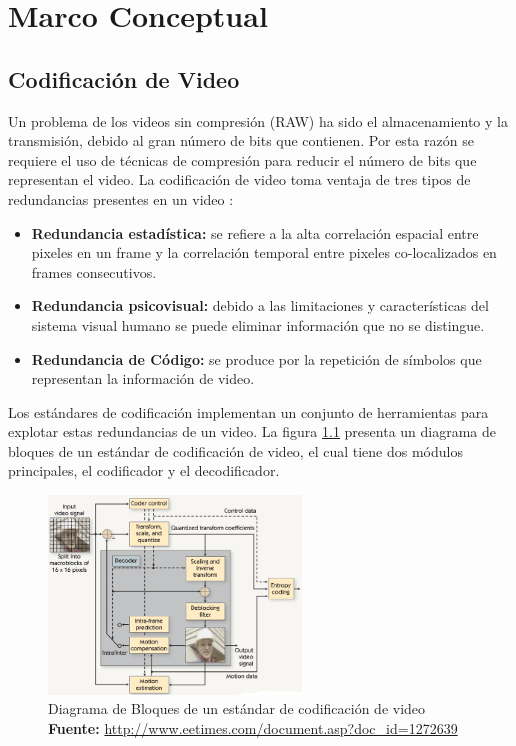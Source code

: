 \chapter{Marco Conceptual}
\label{chap:background}

\section{Codificaci\'on de Video}
Un problema de los videos sin compresi\'on (RAW) ha sido el almacenamiento y la transmisi\'on, debido al gran n\'umero de bits que contienen. Por esta raz\'on se requiere el uso de t\'ecnicas de compresi\'on para reducir el n\'umero de bits que representan el video. La codificaci\'on de video toma ventaja de tres tipos de redundancias  presentes en un video \cite{motion}:
\begin{itemize}
    \item \textbf{Redundancia estad\'istica:} se refiere a la alta correlaci\'on espacial entre pixeles en un frame y la correlaci\'on temporal entre pixeles co-localizados en frames consecutivos.
    \item \textbf{Redundancia psicovisual:} debido a las limitaciones y caracter\'isticas del sistema visual humano se puede eliminar informaci\'on que no se distingue.
    \item \textbf{Redundancia de C\'odigo:} se produce por la repetici\'on de s\'imbolos que representan la informaci\'on de video.
\end{itemize}

Los est\'andares de codificaci\'on implementan un conjunto de herramientas para explotar estas redundancias de un video. La figura \ref{codec} presenta un diagrama de bloques de un est\'andar de codificaci\'on de video, el cual tiene dos m\'odulos principales, el codificador y el decodificador.
	
\begin{figure}[!h]
\centering
\includegraphics[width=0.6\textwidth]{images/codec.png}
\caption[Diagrama de Bloques de un est\'andar de codificaci\'on de video]{Diagrama de Bloques de un est\'andar de codificaci\'on de video
\scriptsize{\textbf{Fuente:} \url{http://www.eetimes.com/document.asp?doc_id=1272639}}}
\label{codec}
\end{figure}

